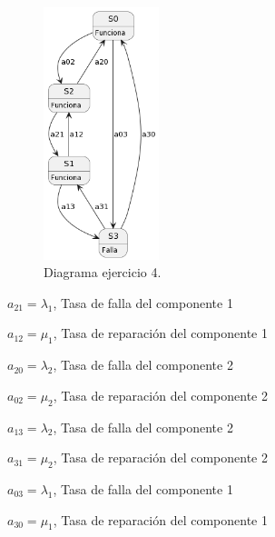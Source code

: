 \documentclass[
    11pt,
    spanish,
    a4paper
]{article}
\begin{document}
\begin{figure}[htbp]
	\centering
	\includegraphics[width=0.3\textwidth]{img/diagrama_estados_2.png}
	\caption{Diagrama ejercicio 4.}
	\label{fig:diagrama_estados_2}
\end{figure}

$ a_{21} = \lambda_1 $, Tasa de falla del componente 1

$ a_{12} = \mu_1 $, Tasa de reparación del componente 1

$ a_{20} = \lambda_2 $, Tasa de falla del componente 2

$ a_{02} = \mu_2 $, Tasa de reparación del componente 2

$ a_{13} = \lambda_2 $, Tasa de falla del componente 2

$ a_{31} = \mu_2 $, Tasa de reparación del componente 2

$ a_{03} = \lambda_1 $, Tasa de falla del componente 1

$ a_{30} = \mu_1 $, Tasa de reparación del componente 1
\end{document}
